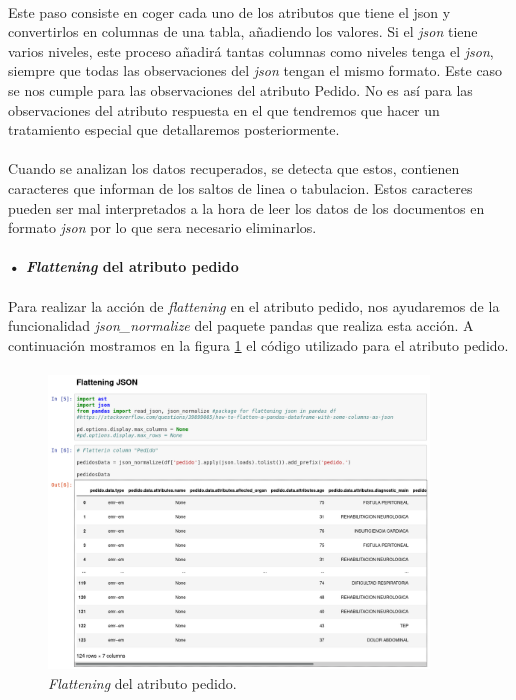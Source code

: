 \documentclass[10pt,a4paper,oneside]{book}
\begin{document}
\paragraph{}
Este paso consiste en coger cada uno de los atributos que tiene el json y convertirlos en columnas de una tabla, añadiendo los valores. Si el \textit{json} tiene varios niveles, este proceso añadirá tantas columnas como niveles tenga el \textit{json}, siempre que todas las observaciones del \textit{json} tengan el mismo formato. Este caso se nos cumple para las observaciones del atributo Pedido. No es así para las observaciones del atributo respuesta en el que tendremos que hacer un tratamiento especial que detallaremos posteriormente.

\paragraph{}
Cuando se analizan los datos recuperados, se detecta que estos, contienen caracteres que informan de los saltos de linea o tabulacion. Estos caracteres pueden ser mal interpretados a la hora de leer los datos de los documentos en formato \textit{json} por lo que sera necesario eliminarlos.

\paragraph{• \textit{Flattening} del atributo pedido}

\paragraph{}
Para realizar la acción de \textit{flattening} en el atributo pedido, nos ayudaremos de la funcionalidad \textit{json\_normalize} del paquete pandas que realiza esta acción. A continuación mostramos en la figura \ref{flatteningPedido} el código utilizado para el atributo pedido.

\paragraph{}
\begin{figure}[!htb]
  \centering
    \includegraphics[width=0.9\textwidth]{images/metodologia-aplanar-pedido.png}
    \caption{\textit{Flattening} del atributo pedido.}
  \label{flatteningPedido}
\end{figure}
\end{document}
